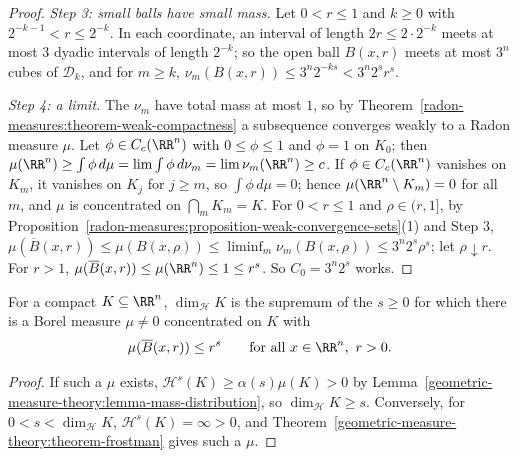 \begin{proof}
\emph{Step 3: small balls have small mass.} Let $0 < r \leq 1$ and $k \geq 0$ with $2^{-k-1} < r \leq 2^{-k}$. In each coordinate, an interval of length $2r \leq 2\cdot2^{-k}$ meets at most $3$ dyadic intervals of length
$2^{-k}$; so the open ball $B(x, r)$ meets at most $3^n$ cubes of $\mathcal{D}_k$, and for $m \geq k$, $\nu_m(B(x, r)) \leq 3^n2^{-ks} < 3^n2^sr^s$.

\emph{Step 4: a limit.} The $\nu_m$ have total mass at most $1$, so by Theorem~\ref{radon-measures:theorem-weak-compactness} a subsequence converges weakly to a Radon measure $\mu$. Let $\phi \in C_c(\RR^n)$
with $0 \leq \phi \leq 1$ and $\phi = 1$ on $K_0$; then $\mu(\RR^n) \geq \int\phi\,d\mu = \lim\int\phi\,d\nu_m = \lim\nu_m(\RR^n) \geq c$. If $\phi \in C_c(\RR^n)$ vanishes on $K_m$, it vanishes on $K_j$ for
$j \geq m$, so $\int\phi\,d\mu = 0$; hence $\mu(\RR^n \setminus K_m) = 0$ for all $m$, and $\mu$ is concentrated on $\bigcap_mK_m = K$. For $0 < r \leq 1$ and $\rho \in (r, 1]$, by
Proposition~\ref{radon-measures:proposition-weak-convergence-sets}(1) and Step 3,
$\mu(\overline{B}(x, r)) \leq \mu(B(x, \rho)) \leq \liminf_m\nu_m(B(x, \rho)) \leq 3^n2^s\rho^s$; let $\rho \downarrow r$. For $r > 1$, $\mu(\overline{B}(x, r)) \leq \mu(\RR^n) \leq 1 \leq r^s$. So
$C_0 = 3^n2^s$ works.
\end{proof}

\begin{corollary}\label{geometric-measure-theory:corollary-frostman-dimension}
For a compact $K \subseteq \RR^n$, $\dim_{\mathcal{H}}K$ is the supremum of the $s \geq 0$ for which there is a Borel measure $\mu \neq 0$ concentrated on $K$ with
\[
\mu(\overline{B}(x, r)) \leq r^s \qquad \text{for all } x \in \RR^n,\ r > 0 .
\]
\end{corollary}

\begin{proof}
If such a $\mu$ exists, $\mathcal{H}^s(K) \geq \alpha(s)\mu(K) > 0$ by Lemma~\ref{geometric-measure-theory:lemma-mass-distribution}, so $\dim_{\mathcal{H}}K \geq s$. Conversely, for $0 < s < \dim_{\mathcal{H}}K$,
$\mathcal{H}^s(K) = \infty > 0$, and Theorem~\ref{geometric-measure-theory:theorem-frostman} gives such a $\mu$.
\end{proof}

